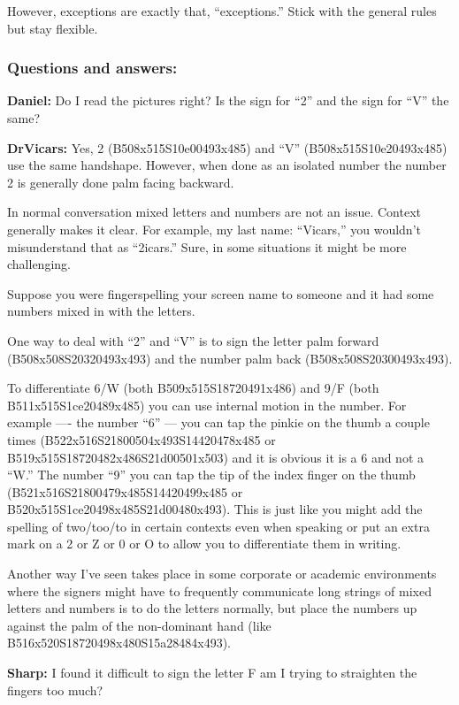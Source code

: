 \documentclass{article}
\begin{document}
However, exceptions are exactly that, ``exceptions.''
Stick with the general rules but stay flexible.

\subsubsection{Questions and answers:}

\textbf{Daniel:}
Do I read the pictures right?
Is the sign for ``2'' and the sign for ``V'' the same?

\textbf{DrVicars:}
Yes, 2 (B508x515S10e00493x485) and ``V'' (B508x515S10e20493x485) use the same handshape.
However, when done as an isolated number the number 2 is generally done palm facing backward.

In normal conversation mixed letters and numbers are not an issue.
Context generally makes it clear.
For example, my last name:
``Vicars,'' you wouldn't misunderstand that as ``2icars.''
Sure, in some situations it might be more challenging.

Suppose you were fingerspelling your screen name to someone and it had some numbers mixed in with the letters.

One way to deal with ``2'' and ``V'' is to sign the letter palm forward (B508x508S20320493x493) and the number palm back (B508x508S20300493x493).

To differentiate 6/W (both B509x515S18720491x486) and 9/F (both B511x515S1ce20489x485) you can use internal motion in the number.
For example ----
the number ``6'' ---
you can tap the pinkie on the thumb a couple times (B522x516S21800504x493S14420478x485 or B519x515S18720482x486S21d00501x503) and it is obvious it is a 6 and not a ``W.''
The number ``9'' you can tap the tip of the index finger on the thumb (B521x516S21800479x485S14420499x485 or B520x515S1ce20498x485S21d00480x493).
This is just like you might add the spelling of two/too/to in certain contexts even when speaking or put an extra mark on a 2 or Z or 0 or O to allow you to differentiate them in writing.

Another way I've seen takes place in some corporate or academic environments where the signers might have to frequently communicate long strings of mixed letters and numbers is to do the letters normally, but place the numbers up against the palm of the non-dominant hand (like B516x520S18720498x480S15a28484x493).


\textbf{Sharp:}
I found it difficult to sign the letter F am I trying to straighten the fingers too much?
\end{document}
